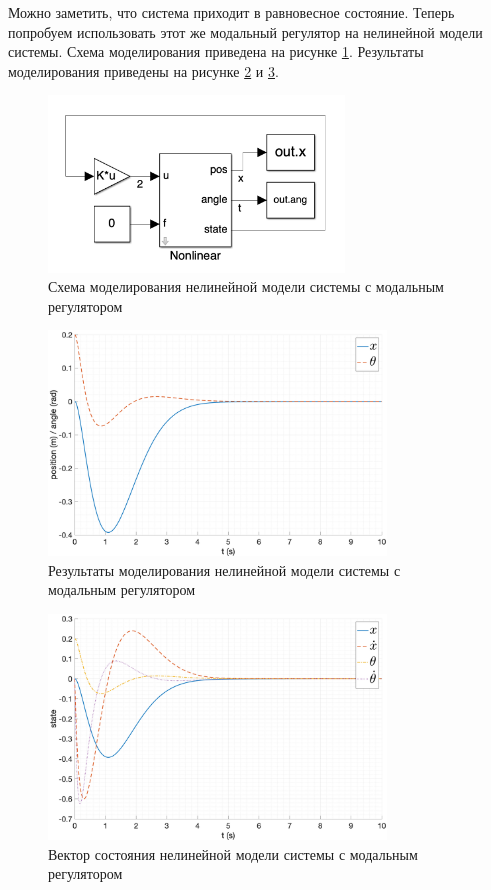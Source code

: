 Можно заметить, что система приходит в равновесное состояние. Теперь попробуем использовать этот же 
модальный регулятор на нелинейной модели системы. Схема моделирования приведена на
рисунке \ref{fig:modal_control_scheme_nonlinear}. Результаты моделирования приведены на
рисунке \ref{fig:modal_control_nonlinear_out} и \ref{fig:modal_control_nonlinear_state}.


\begin{figure}[ht!]
    \centering
    \includegraphics[width=0.7\textwidth]{media/modal_control_scheme.png}
    \caption{Схема моделирования нелинейной модели системы с модальным регулятором}
    \label{fig:modal_control_scheme_nonlinear}
\end{figure}
\begin{figure}[ht!]
    \centering
    \includegraphics[width=0.8\textwidth]{media/plots/modal_control/out_0.png}
    \caption{Результаты моделирования нелинейной модели системы с модальным регулятором}
    \label{fig:modal_control_nonlinear_out}
\end{figure}
\begin{figure}[ht!]
    \centering
    \includegraphics[width=0.8\textwidth]{media/plots/modal_control/state_0.png}
    \caption{Вектор состояния нелинейной модели системы с модальным регулятором}
    \label{fig:modal_control_nonlinear_state}
\end{figure}

